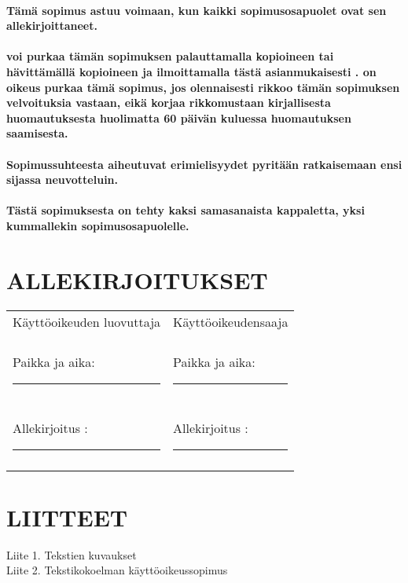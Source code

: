 \documentclass[a4paper,finnish]{article}
\begin{document}
\paragraph{Tämä sopimus astuu voimaan, kun kaikki sopimusosapuolet ovat sen
allekirjoittaneet.}

\paragraph{ voi purkaa tämän sopimuksen
palauttamalla  kopioineen  tai hävittämällä  kopioineen ja
ilmoittamalla tästä asianmukaisesti .  on oikeus purkaa
tämä sopimus, jos  olennaisesti rikkoo tämän
sopimuksen velvoituksia vastaan, eikä korjaa rikkomustaan
kirjallisesta huomautuksesta huolimatta 60 päivän kuluessa
huomautuksen saamisesta.}

\paragraph{Sopimussuhteesta aiheutuvat erimielisyydet pyritään
ratkaisemaan ensi sijassa neuvotteluin.}

\paragraph{Tästä sopimuksesta on tehty kaksi samasanaista kappaletta,
yksi kummallekin sopimusosapuolelle.}

\section{ALLEKIRJOITUKSET}

\begin{tabular}{ll}
Käyttöoikeuden luovuttaja & Käyttöoikeudensaaja \\
 & \\
Paikka ja aika: \rule{2in}{.01in} & Paikka ja aika: \rule{2in}{.01in} \\ \\
Allekirjoitus : \rule{2in}{.01in} & Allekirjoitus : \rule{2in}{.01in} \\ \\
\end{tabular}


\section{LIITTEET}
Liite 1. Tekstien kuvaukset \\
Liite 2. Tekstikokoelman käyttöoikeussopimus \\
\end{document}

